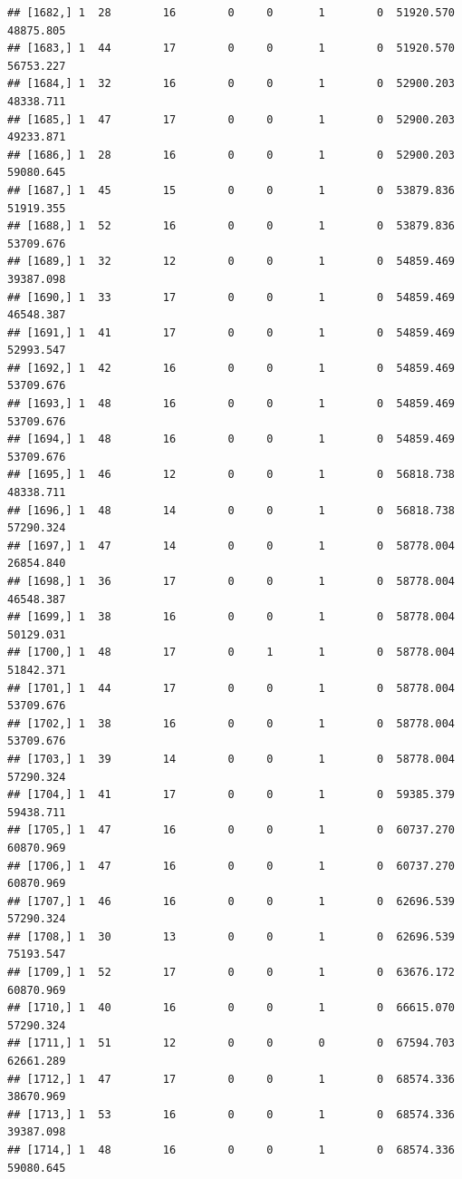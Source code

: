 \documentclass[
]{article}
\begin{document}
\begin{verbatim}
## [1682,] 1  28        16        0     0       1        0  51920.570  48875.805
## [1683,] 1  44        17        0     0       1        0  51920.570  56753.227
## [1684,] 1  32        16        0     0       1        0  52900.203  48338.711
## [1685,] 1  47        17        0     0       1        0  52900.203  49233.871
## [1686,] 1  28        16        0     0       1        0  52900.203  59080.645
## [1687,] 1  45        15        0     0       1        0  53879.836  51919.355
## [1688,] 1  52        16        0     0       1        0  53879.836  53709.676
## [1689,] 1  32        12        0     0       1        0  54859.469  39387.098
## [1690,] 1  33        17        0     0       1        0  54859.469  46548.387
## [1691,] 1  41        17        0     0       1        0  54859.469  52993.547
## [1692,] 1  42        16        0     0       1        0  54859.469  53709.676
## [1693,] 1  48        16        0     0       1        0  54859.469  53709.676
## [1694,] 1  48        16        0     0       1        0  54859.469  53709.676
## [1695,] 1  46        12        0     0       1        0  56818.738  48338.711
## [1696,] 1  48        14        0     0       1        0  56818.738  57290.324
## [1697,] 1  47        14        0     0       1        0  58778.004  26854.840
## [1698,] 1  36        17        0     0       1        0  58778.004  46548.387
## [1699,] 1  38        16        0     0       1        0  58778.004  50129.031
## [1700,] 1  48        17        0     1       1        0  58778.004  51842.371
## [1701,] 1  44        17        0     0       1        0  58778.004  53709.676
## [1702,] 1  38        16        0     0       1        0  58778.004  53709.676
## [1703,] 1  39        14        0     0       1        0  58778.004  57290.324
## [1704,] 1  41        17        0     0       1        0  59385.379  59438.711
## [1705,] 1  47        16        0     0       1        0  60737.270  60870.969
## [1706,] 1  47        16        0     0       1        0  60737.270  60870.969
## [1707,] 1  46        16        0     0       1        0  62696.539  57290.324
## [1708,] 1  30        13        0     0       1        0  62696.539  75193.547
## [1709,] 1  52        17        0     0       1        0  63676.172  60870.969
## [1710,] 1  40        16        0     0       1        0  66615.070  57290.324
## [1711,] 1  51        12        0     0       0        0  67594.703  62661.289
## [1712,] 1  47        17        0     0       1        0  68574.336  38670.969
## [1713,] 1  53        16        0     0       1        0  68574.336  39387.098
## [1714,] 1  48        16        0     0       1        0  68574.336  59080.645

\end{verbatim}
\end{document}
